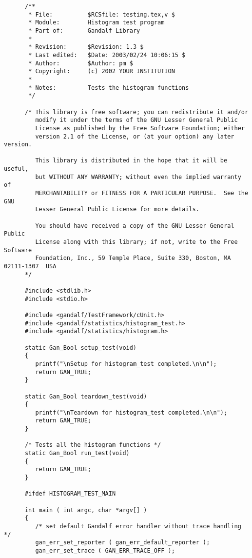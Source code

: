 \begin{verbatim}
      /**
       * File:          $RCSfile: testing.tex,v $
       * Module:        Histogram test program
       * Part of:       Gandalf Library
       *
       * Revision:      $Revision: 1.3 $
       * Last edited:   $Date: 2003/02/24 10:06:15 $
       * Author:        $Author: pm $
       * Copyright:     (c) 2002 YOUR INSTITUTION
       *
       * Notes:         Tests the histogram functions
       */

      /* This library is free software; you can redistribute it and/or
         modify it under the terms of the GNU Lesser General Public
         License as published by the Free Software Foundation; either
         version 2.1 of the License, or (at your option) any later version.

         This library is distributed in the hope that it will be useful,
         but WITHOUT ANY WARRANTY; without even the implied warranty of
         MERCHANTABILITY or FITNESS FOR A PARTICULAR PURPOSE.  See the GNU
         Lesser General Public License for more details.

         You should have received a copy of the GNU Lesser General Public
         License along with this library; if not, write to the Free Software
         Foundation, Inc., 59 Temple Place, Suite 330, Boston, MA  02111-1307  USA
      */

      #include <stdlib.h>
      #include <stdio.h>

      #include <gandalf/TestFramework/cUnit.h>
      #include <gandalf/statistics/histogram_test.h>
      #include <gandalf/statistics/histogram.h>

      static Gan_Bool setup_test(void)
      {
         printf("\nSetup for histogram_test completed.\n\n");
         return GAN_TRUE;
      }

      static Gan_Bool teardown_test(void)
      {
         printf("\nTeardown for histogram_test completed.\n\n");
         return GAN_TRUE;
      }

      /* Tests all the histogram functions */
      static Gan_Bool run_test(void)
      {  
         return GAN_TRUE;
      }

      #ifdef HISTOGRAM_TEST_MAIN

      int main ( int argc, char *argv[] )
      {
         /* set default Gandalf error handler without trace handling */ 
         gan_err_set_reporter ( gan_err_default_reporter );
         gan_err_set_trace ( GAN_ERR_TRACE_OFF );


\end{verbatim}
